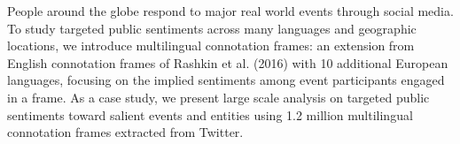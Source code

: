 People around the globe respond to major real world events through social media.              To study targeted public sentiments across many languages and geographic locations, we introduce multilingual connotation frames: an extension from English connotation frames of Rashkin et al. (2016) with 10 additional European languages, focusing on the implied sentiments among event participants engaged in a frame. As a case study, we present large scale analysis on targeted public sentiments toward salient events and entities using 1.2 million multilingual connotation frames extracted from Twitter.
